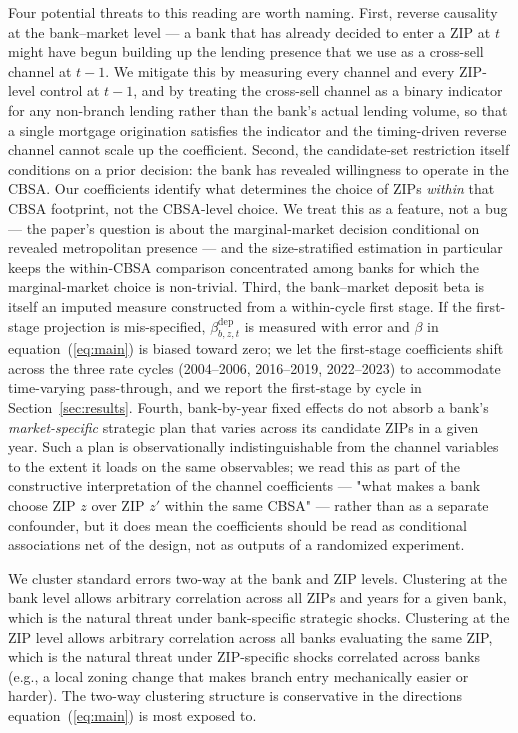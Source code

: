 Four potential threats to this reading are worth naming. First, reverse causality at the bank--market level --- a bank that has already decided to enter a ZIP at $t$ might have begun building up the lending presence that we use as a cross-sell channel at $t-1$. We mitigate this by measuring every channel and every ZIP-level control at $t-1$, and by treating the cross-sell channel as a binary indicator for any non-branch lending rather than the bank's actual lending volume, so that a single mortgage origination satisfies the indicator and the timing-driven reverse channel cannot scale up the coefficient. Second, the candidate-set restriction itself conditions on a prior decision: the bank has revealed willingness to operate in the CBSA. Our coefficients identify what determines the choice of ZIPs \emph{within} that CBSA footprint, not the CBSA-level choice. We treat this as a feature, not a bug --- the paper's question is about the marginal-market decision conditional on revealed metropolitan presence --- and the size-stratified estimation in particular keeps the within-CBSA comparison concentrated among banks for which the marginal-market choice is non-trivial. Third, the bank--market deposit beta is itself an imputed measure constructed from a within-cycle first stage. If the first-stage projection is mis-specified, $\beta^{\mathrm{dep}}_{b,z,t}$ is measured with error and $\beta$ in equation~(\ref{eq:main}) is biased toward zero; we let the first-stage coefficients shift across the three rate cycles (2004--2006, 2016--2019, 2022--2023) to accommodate time-varying pass-through, and we report the first-stage by cycle in Section~\ref{sec:results}. Fourth, bank-by-year fixed effects do not absorb a bank's \emph{market-specific} strategic plan that varies across its candidate ZIPs in a given year. Such a plan is observationally indistinguishable from the channel variables to the extent it loads on the same observables; we read this as part of the constructive interpretation of the channel coefficients --- "what makes a bank choose ZIP $z$ over ZIP $z'$ within the same CBSA" --- rather than as a separate confounder, but it does mean the coefficients should be read as conditional associations net of the design, not as outputs of a randomized experiment.

We cluster standard errors two-way at the bank and ZIP levels. Clustering at the bank level allows arbitrary correlation across all ZIPs and years for a given bank, which is the natural threat under bank-specific strategic shocks. Clustering at the ZIP level allows arbitrary correlation across all banks evaluating the same ZIP, which is the natural threat under ZIP-specific shocks correlated across banks (e.g., a local zoning change that makes branch entry mechanically easier or harder). The two-way clustering structure is conservative in the directions equation~(\ref{eq:main}) is most exposed to.

